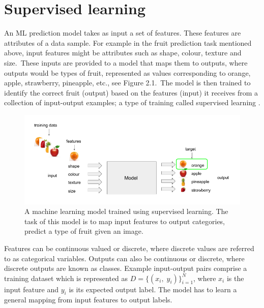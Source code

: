 
\section{Supervised learning}

An ML prediction model takes as input a set of features. These features are attributes of a data sample. For example in the fruit prediction task mentioned above, input features might be attributes such as shape, colour, texture and size.\ These inputs are provided to a model that maps them to outputs, where outputs would be types of fruit, represented as values corresponding to orange, apple, strawberry, pineapple, etc., see Figure 2.1.\ The model is then trained to identify the correct fruit (output) based on the features (input) it receives from a collection of input-output examples; a type of training called supervised learning \citep{bishop2006pattern}.

\begin{figure}[H]
   	\centering
    	\includegraphics[width=1.0\textwidth, height=0.4\textwidth]{supervised_learning}
	\captionsetup{justification=centering}
	\caption{A machine learning model trained using supervised learning. The task of this model is to map input features to output categories, predict a type of fruit given an image.}
\end{figure}

\noindent Features can be continuous valued or discrete, where discrete values are referred to as categorical variables. Outputs can also be continuous or discrete, where discrete outputs are known as classes. Example input-output pairs comprise a training dataset which is represented as \begin{math} D = \{(x_i, \; y_i)\}_{i=1}^N \end{math}, where \begin{math} x_i \end{math} is the input feature and \begin{math} y_i \end{math} is its expected output label. The model has to learn a general mapping from input features to output labels. \par

